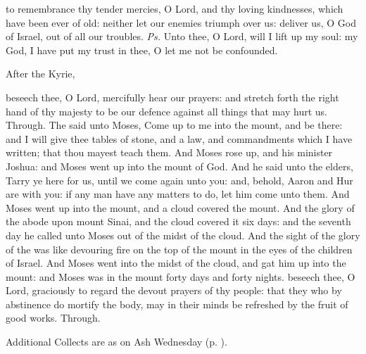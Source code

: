 \introit
{} to remembrance thy tender mercies, O Lord, and thy loving kindnesses, which have been ever of old: neither let our enemies triumph over us: deliver us, O God of Israel, out of all our troubles. \textit{Ps.} Unto thee, O Lord, will I lift up my soul: my God, I have put my trust in thee, O let me not be confounded.
\begin{rubric}
    After the Kyrie,
\end{rubric}
\collect
{} beseech thee, O Lord, mercifully hear our prayers: and stretch forth the right hand of thy majesty to be our defence against all things that may hurt us. Through.
 The  said unto Moses, Come up to me into the mount, and be there: and I will give thee tables of stone, and a law, and commandments which I have written; that thou mayest teach them. And Moses rose up, and his minister Joshua: and Moses went up into the mount of God. And he said unto the elders, Tarry ye here for us, until we come again unto you: and, behold, Aaron and Hur are with you: if any man have any matters to do, let him come unto them. And Moses went up into the mount, and a cloud covered the mount. And the glory of the  abode upon mount Sinai, and the cloud covered it six days: and the seventh day he called unto Moses out of the midst of the cloud. And the sight of the glory of the  was like devouring fire on the top of the mount in the eyes of the children of Israel. And Moses went into the midst of the cloud, and gat him up into the mount: and Moses was in the mount forty days and forty nights.
{} beseech thee, O Lord, graciously to regard the devout prayers of thy people: that they who by abstinence do mortify the body, may in their minds be refreshed by the fruit of good works. Through.
\begin{rubric}
    Additional Collects are as on Ash Wednesday (p. \pageref{AshWednesdayMassCollect}).
\end{rubric}
